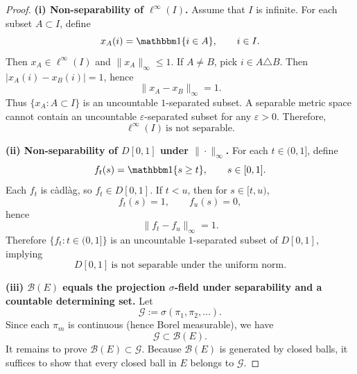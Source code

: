 \documentclass[12pt]{article}
\renewcommand{\(}{\left(}%
\renewcommand{\)}{\right)}%
\renewcommand{\[}{\left[}%
\renewcommand{\]}{\right]}%
\newtheorem{proof}{Proof.}}
\begin{document}
\begin{proof}

\textbf{(i) Non-separability of $\ell^\infty(I)$.}
Assume that $I$ is infinite. For each subset $A\subset I$, define
\begin{equation*}
x_A(i)=\mathbbm 1\{i\in A\}, \qquad i\in I.
\end{equation*}
Then $x_A\in \ell^\infty(I)$ and $\|x_A\|_\infty\le 1$. If $A\neq B$, pick $i\in A\triangle B$.
Then $|x_A(i)-x_B(i)|=1$, hence
\begin{equation*}
\|x_A-x_B\|_\infty=1.
\end{equation*}
Thus $\{x_A:A\subset I\}$ is an uncountable $1$-separated subset. A separable metric space
cannot contain an uncountable $\varepsilon$-separated subset for any $\varepsilon>0$.
Therefore,
\begin{equation*}
\ell^\infty(I)\ \text{is not separable.}
\end{equation*}

\medskip
\noindent
\textbf{(ii) Non-separability of $D[0,1]$ under $\|\cdot\|_\infty$.}
For each $t\in(0,1]$, define
\begin{equation*}
f_t(s)=\mathbbm 1\{s\ge t\}, \qquad s\in[0,1].
\end{equation*}
Each $f_t$ is càdlàg, so $f_t\in D[0,1]$. If $t<u$, then for $s\in[t,u)$,
\begin{equation*}
f_t(s)=1,\qquad f_u(s)=0,
\end{equation*}
hence
\begin{equation*}
\|f_t-f_u\|_\infty=1.
\end{equation*}
Therefore $\{f_t:t\in(0,1]\}$ is an uncountable $1$-separated subset of $D[0,1]$, implying
\begin{equation*}
D[0,1]\ \text{is not separable under the uniform norm.}
\end{equation*}

\medskip
\noindent
\textbf{(iii) $\mathcal B(E)$ equals the projection $\sigma$-field under separability and a countable determining set.}
Let
\begin{equation*}
\mathcal G:=\sigma(\pi_1,\pi_2,\dots).
\end{equation*}
Since each $\pi_m$ is continuous (hence Borel measurable), we have
\begin{equation*}
\mathcal G\subset \mathcal B(E).
\end{equation*}
It remains to prove $\mathcal B(E)\subset \mathcal G$. Because $\mathcal B(E)$ is generated by closed balls,
it suffices to show that every closed ball in $E$ belongs to $\mathcal G$.


\end{proof}
\end{document}
